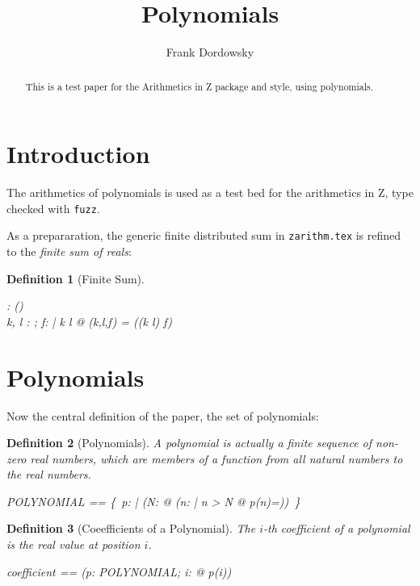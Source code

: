 \documentclass[12pt]{scrartcl}
\newtheorem{zdef}{Definition}[section]
\begin{document}
\title{Polynomials}
\author{Frank Dordowsky}

\maketitle

\begin{abstract}
  This is a test paper for the Arithmetics in Z package and style,
  using polynomials.
\end{abstract}


\section{Introduction}
\label{sec:intro}
The arithmetics of polynomials is used as a test bed for the
arithmetics in Z, type checked with \texttt{fuzz}.

As a prepararation, the generic finite distributed sum in
\texttt{zarithm.tex} is refined to the \emph{finite sum of reals}:
\newcommand{\finsum}{\sum}
\begin{zdef}[Finite Sum]
  \label{zdef:finite-sum}
  
  \begin{axdef}
    \finsum : \nat \cross \nat \cross (\nat \fun \real) \fun \real \\
    \where
    \forall k, l : \nat; f: \nat \fun \real | k \leq l @
    \finsum(k,l,f) = \findistsum((k \upto l) \dres f)
  \end{axdef}
\end{zdef}

\section{Polynomials}
\label{sec:polynomials}
Now the central definition of the paper, the set of polynomials:
\begin{zdef}[Polynomials]
  \label{zdef:polynomials}
  A polynomial is actually a finite sequence of non-zero real numbers,
  which are members of a function from all natural numbers to the real
  numbers.
  \begin{zed}
    POLYNOMIAL == \{~p: \nat \fun \real | (\exists N: \nat @ (\forall n:
    \nat | n > N @ p(n)=\azero))~\}
  \end{zed}
\end{zdef}

\begin{zdef}[Coeefficients of a Polynomial]
  \label{zdef:coefficient}
  The $i$-th coefficient of a polynomial is the real value at position
  $i$. 
  \begin{zed}
    coefficient == (\lambda p: POLYNOMIAL; i: \nat @ p(i))
  \end{zed}
\end{zdef}
\end{document}
